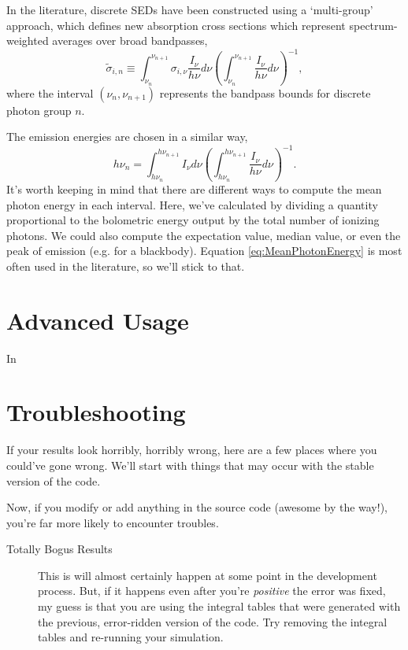 \documentclass[letterpaper,titlepage,12pt]{article}
\numberwithin{equation}{section}
\begin{document}
In the literature, discrete SEDs have been constructed using a `multi-group'
approach, which defines new absorption cross sections which represent
spectrum-weighted averages over broad bandpasses,
\begin{equation}
    \tilde{\sigma}_{i,n} \equiv \int_{\nu_n}^{\nu_{n+1}} \sigma_{i,\nu} \frac{I_{\nu}}{h\nu}  d\nu \left(\int_{\nu_n}^{\nu_{n+1}}\frac{I_{\nu}}{h\nu}d\nu \right)^{-1} ,
\end{equation}    
where the interval $(\nu_n, \nu_{n+1})$ represents the bandpass bounds for
discrete photon group $n$.

The emission energies are chosen in a similar way, 
\begin{equation}
    h\nu_n = \int_{h\nu_n}^{h\nu_{n+1}} I_{\nu} d\nu \left(\int_{h\nu_n}^{h\nu_{n+1}} \frac{I_{\nu}}{h\nu} d\nu \right)^{-1} . \label{eq:MeanPhotonEnergy}
\end{equation}    
It's worth keeping in mind that there are different ways to compute the mean
photon energy in each interval. Here, we've calculated by dividing a quantity
proportional to the bolometric energy output by the total number of ionizing
photons. We could also compute the expectation value, median value, or even
the peak of emission (e.g. for a blackbody). Equation
\ref{eq:MeanPhotonEnergy} is most often used in the literature, so we'll stick
to that.




\section{Advanced Usage}
In \cite{Mirocha2012}


\section{Troubleshooting}
If your results look horribly, horribly wrong, here are a few places where you could've gone wrong.  We'll start with things that may occur with the stable version of the code.


Now, if you modify or add anything in the source code (awesome by the way!), you're far more likely to encounter troubles.


\begin{description}
    \item[Totally Bogus Results] This is will almost certainly happen at some point in the development process. But, if it happens even after you're \textit{positive} the error was fixed, my guess is that you are using the integral tables that were generated with the previous, error-ridden version of the code.  Try removing the integral tables and re-running your simulation.
\end{description}
\end{document}
